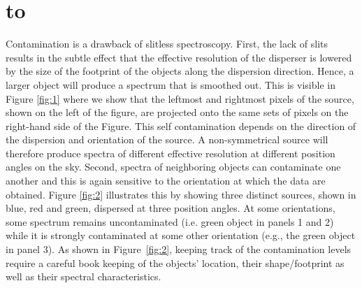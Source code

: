 \documentclass[12pt]{article}
\def\ssection#1{\section{\hbox to \hsize{\large\bf #1\hfill}}}
\begin{document}
\ssection{Contamination}
Contamination is a drawback of slitless spectroscopy. First, the lack of slits results in the subtle effect that the effective resolution of the disperser is lowered by the size of the footprint of the objects along the dispersion direction. Hence, a larger object will produce a spectrum that is smoothed out. This is visible in Figure \ref{fig:1} where we show that the leftmost and rightmost pixels of the source, shown on the left of the figure, are projected onto the same sets of pixels on the right-hand side of the Figure. This self contamination depends on the direction of the dispersion and orientation of the source. A non-symmetrical source will therefore produce spectra of different effective resolution at different position angles on the sky. Second, spectra of neighboring objects can contaminate one another and this is again sensitive to the orientation at which the data are obtained. Figure \ref{fig:2} illustrates this by showing three distinct sources, shown in blue, red and green, dispersed at three position angles. At some orientations, some spectrum remains uncontaminated (i.e. green object in panels 1 and 2) while it is strongly contaminated at some other orientation (e.g., the green object in panel 3). As shown in Figure~\ref{fig:2}, keeping track of the contamination levels require a careful book keeping of the objects' location, their shape/footprint as well as their spectral characteristics.
\end{document}
